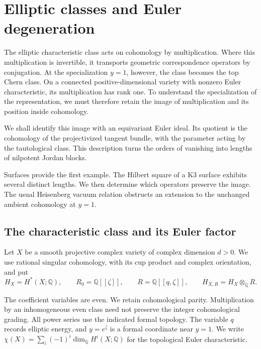 \chapter{Elliptic classes and Euler degeneration}
\label{ed:chap:euler}

The elliptic characteristic class acts on cohomology by multiplication.
Where this multiplication is invertible, it transports geometric
correspondence operators by conjugation. At the specialization $y=1$, however, the class
becomes the top Chern class. On a connected positive-dimensional variety
with nonzero Euler characteristic, its multiplication has rank one.
To understand the specialization of the representation, we must therefore
retain the image of multiplication and its position inside cohomology.

We shall identify this image with an equivariant Euler ideal. Its quotient
is the cohomology of the projectivized tangent bundle, with the parameter
acting by the tautological class. This description turns the orders of
vanishing into lengths of nilpotent Jordan blocks.

Surfaces provide the
first example. The Hilbert square of a K3 surface exhibits several distinct
lengths. We then determine which operators preserve the image.
The usual Heisenberg vacuum relation obstructs an extension to the
unchanged ambient cohomology at $y=1$.

\section{The characteristic class and its Euler factor}
\label{ed:sec:factor}

Let $X$ be a smooth projective complex variety of complex dimension $d>0$.
We use rational singular cohomology, with its cup product and complex
orientation, and put
\[
 H_X=H^*(X;\mathbb Q),\qquad
 R_0=\mathbb Q[[\zeta]],\qquad R=\mathbb Q[[q,\zeta]],\qquad
 H_{X,R}=H_X\otimes_{\mathbb Q}R.
\]

The coefficient variables are even. We retain cohomological parity.
Multiplication by an inhomogeneous even class need not preserve the
integer cohomological grading. All power series use the indicated formal
topology. The variable $q$ records elliptic energy, and $y=e^\zeta$ is a
formal coordinate near $y=1$. We write
$\chi(X)=\sum_i(-1)^i\dim_{\mathbb Q}H^i(X;\mathbb Q)$
for the topological Euler characteristic.

